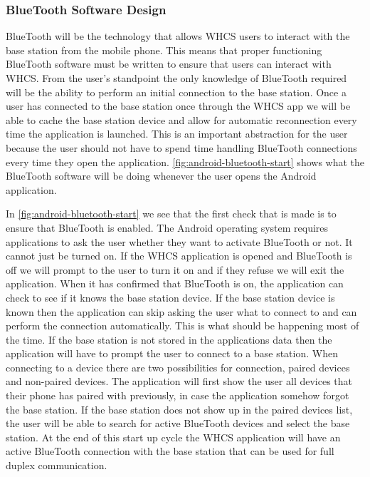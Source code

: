 \subsubsection{BlueTooth Software Design} BlueTooth will be the technology that
allows WHCS users to interact with the base station from the mobile phone. This
means that proper functioning BlueTooth software must be written to ensure that
users can interact with WHCS. From the user{}'s standpoint the only knowledge
of BlueTooth required will be the ability to perform an initial connection to
the base station. Once a user has connected to the base station once through
the WHCS app we will be able to cache the base station device and allow for
automatic reconnection every time the application is launched. This is an
important abstraction for the user because the user should not have to spend
time handling BlueTooth connections every time they open the application.
\autoref{fig:android-bluetooth-start} shows what the BlueTooth software will be
doing whenever the user opens the Android application.


In \autoref{fig:android-bluetooth-start} we see that the first check that is
made is to ensure that BlueTooth is enabled. The Android operating system
requires applications to ask the user whether they want to activate BlueTooth
or not. It cannot just be turned on. If the WHCS application is opened and
BlueTooth is off we will prompt to the user to turn it on and if they refuse we
will exit the application. When it has confirmed that BlueTooth is on, the
application can check to see if it knows the base station device. If the base
station device is known then the application can skip asking the user what to
connect to and can perform the connection automatically. This is what should be
happening most of the time. If the base station is not stored in the
applications data then the application will have to prompt the user to connect
to a base station. When connecting to a device there are two possibilities for
connection, paired devices and non{}-paired devices. The application will first
show the user all devices that their phone has paired with previously, in case
the application somehow forgot the base station. If the base station does not
show up in the paired devices list, the user will be able to search for active
BlueTooth devices and select the base station. At the end of this start up
cycle the WHCS application will have an active BlueTooth connection with the
base station that can be used for full duplex communication.

